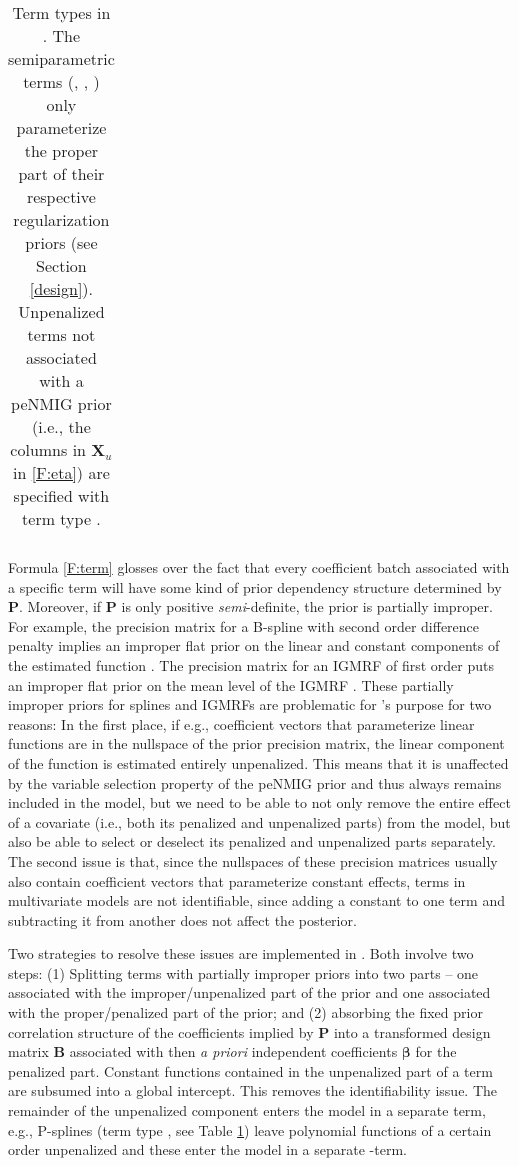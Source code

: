 \documentclass[article, shortnames, nojss, noheadings, notitle]{jss}
\begin{document}
\begin{table}[!tbp]
\begin{small}
\begin{center}
\begin{tabular}{l|p{}|p{}|p{}}
\end{tabular}
\end{center}
\caption[Term types]{Term types in .
The semiparametric terms (, , ) only parameterize the proper part
of their respective regularization priors (see Section \ref{design}). Unpenalized terms not associated with a
peNMIG prior (i.e., the columns in $\bm X_u$ in \eqref{F:eta}) are specified with term type .}
\label{T:termtypes}
\end{small}
\end{table}

Formula \eqref{F:term} glosses over the fact that every coefficient batch associated with a specific term will
have some kind of prior dependency structure determined by $\bm P$.
Moreover, if $\bm P$ is only positive \emph{semi}-definite, the prior is partially improper. For example,
the precision matrix for a B-spline with second order difference penalty implies an improper flat prior on the
linear and constant components of the estimated function \citep{Lang:Brezger:2004}.
The precision matrix for an IGMRF of first order puts an improper flat prior on the mean level of the IGMRF \citep[][ch. 3]{Rue:Held:2005}.
These partially improper priors for splines and IGMRFs are problematic for 's purpose for two reasons:
In the first place, if e.g., coefficient vectors that parameterize linear functions are in the nullspace of the prior precision matrix,
the linear component of the function is estimated entirely
unpenalized. This means that it is unaffected by the variable selection property of the peNMIG prior and thus always remains
included in the model, but we need to be able to not only remove the entire effect
of a covariate (i.e., both its penalized and unpenalized parts) from the model, but also be able to select or deselect its
penalized and unpenalized parts separately.
The second issue is that, since the nullspaces of these precision matrices usually also contain coefficient vectors that
parameterize constant effects, terms in multivariate models are not identifiable, since adding a constant to one term
and subtracting it from another does not affect the posterior.

Two strategies to resolve these issues are implemented in . Both
involve two steps: (1) Splitting terms with partially improper priors into two parts -- one associated with
the improper/unpenalized part of the prior and one associated with the proper/penalized part of the prior;
and (2) absorbing the fixed prior correlation
structure of the coefficients implied by $\bm P$ into a transformed design matrix $\bm B$ associated with then
\emph{a priori} independent coefficients $\bm\beta$ for the penalized part.
Constant functions contained in the unpenalized part of a term are subsumed into a global intercept.
This removes the identifiability issue.
The remainder of the unpenalized component enters the model in a separate term, e.g.,
P-splines (term type , see Table \ref{T:termtypes}) leave polynomial functions of a certain order
unpenalized and these enter the model in a separate -term.
\end{document}
